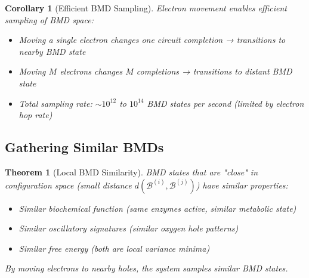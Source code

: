 \documentclass[12pt,a4paper]{article}
\newtheorem{corollary}{Corollary}
\newtheorem{theorem}{Theorem}
\begin{document}
\begin{corollary}[Efficient BMD Sampling]
\label{cor:efficient_sampling}
Electron movement enables efficient sampling of BMD space:
\begin{itemize}
\item Moving a single electron changes one circuit completion → transitions to nearby BMD state
\item Moving $M$ electrons changes $M$ completions → transitions to distant BMD state
\item Total sampling rate: $\sim 10^{12}$ to $10^{14}$ BMD states per second (limited by electron hop rate)
\end{itemize}
\end{corollary}

\subsection{Gathering Similar BMDs}

\begin{theorem}[Local BMD Similarity]
\label{thm:local_similarity}
BMD states that are "close" in configuration space (small distance $d(\mathcal{B}^{(i)}, \mathcal{B}^{(j)})$) have similar properties:
\begin{itemize}
\item Similar biochemical function (same enzymes active, similar metabolic state)
\item Similar oscillatory signatures (similar oxygen hole patterns)
\item Similar free energy (both are local variance minima)
\end{itemize}

By moving electrons to nearby holes, the system samples \textit{similar} BMD states.
\end{theorem}
\end{document}
